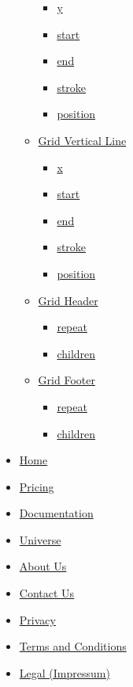 \begin{itemize}
\begin{itemize}
    \begin{itemize}
    \tightlist
    \item
      \hyperref[definitions-hline-y]{y}
    \item
      \hyperref[definitions-hline-start]{start}
    \item
      \hyperref[definitions-hline-end]{end}
    \item
      \hyperref[definitions-hline-stroke]{stroke}
    \item
      \hyperref[definitions-hline-position]{position}
    \end{itemize}
  \item
    \hyperref[definitions-vline]{Grid Vertical Line}

    \begin{itemize}
    \tightlist
    \item
      \hyperref[definitions-vline-x]{x}
    \item
      \hyperref[definitions-vline-start]{start}
    \item
      \hyperref[definitions-vline-end]{end}
    \item
      \hyperref[definitions-vline-stroke]{stroke}
    \item
      \hyperref[definitions-vline-position]{position}
    \end{itemize}
  \item
    \hyperref[definitions-header]{Grid Header}

    \begin{itemize}
    \tightlist
    \item
      \hyperref[definitions-header-repeat]{repeat}
    \item
      \hyperref[definitions-header-children]{children}
    \end{itemize}
  \item
    \hyperref[definitions-footer]{Grid Footer}

    \begin{itemize}
    \tightlist
    \item
      \hyperref[definitions-footer-repeat]{repeat}
    \item
      \hyperref[definitions-footer-children]{children}
    \end{itemize}
  \end{itemize}
\end{itemize}

\begin{itemize}
\tightlist
\item
  \href{/}{Home}
\item
  \href{/pricing/}{Pricing}
\item
  \href{/docs/}{Documentation}
\item
  \href{/universe/}{Universe}
\item
  \href{/about/}{About Us}
\item
  \href{/contact/}{Contact Us}
\item
  \href{/privacy/}{Privacy}
\item
  \href{https://typst.app/terms}{Terms and Conditions}
\item
  \href{/legal/}{Legal (Impressum)}
\end{itemize}

